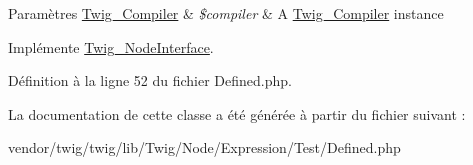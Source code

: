 \begin{DoxyParams}[1]{Paramètres}
\hyperlink{class_twig___compiler}{Twig\+\_\+\+Compiler} & {\em \$compiler} & A \hyperlink{class_twig___compiler}{Twig\+\_\+\+Compiler} instance \\
\hline
\end{DoxyParams}


Implémente \hyperlink{interface_twig___node_interface_a4e0faa87c3fae583620b84d3607085da}{Twig\+\_\+\+Node\+Interface}.



Définition à la ligne 52 du fichier Defined.\+php.



La documentation de cette classe a été générée à partir du fichier suivant \+:\begin{DoxyCompactItemize}
\item 
vendor/twig/twig/lib/\+Twig/\+Node/\+Expression/\+Test/Defined.\+php\end{DoxyCompactItemize}
